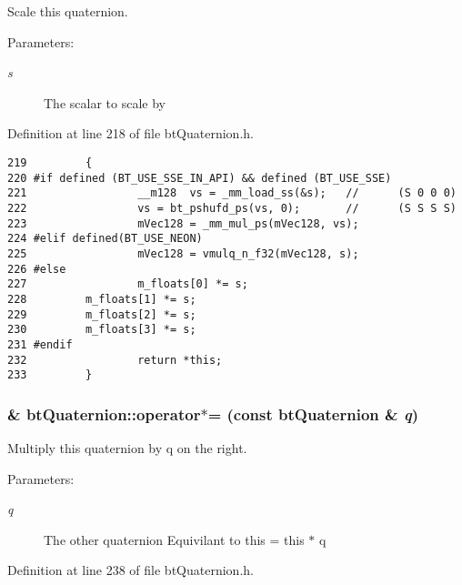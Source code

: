 Scale this quaternion. 

\begin{Desc}
\item[Parameters:]
\begin{description}
\item[{\em s}]The scalar to scale by \end{description}
\end{Desc}


Definition at line 218 of file btQuaternion.h.

\begin{Code}\begin{verbatim}219         {
220 #if defined (BT_USE_SSE_IN_API) && defined (BT_USE_SSE)
221                 __m128  vs = _mm_load_ss(&s);   //      (S 0 0 0)
222                 vs = bt_pshufd_ps(vs, 0);       //      (S S S S)
223                 mVec128 = _mm_mul_ps(mVec128, vs);
224 #elif defined(BT_USE_NEON)
225                 mVec128 = vmulq_n_f32(mVec128, s);
226 #else
227                 m_floats[0] *= s; 
228         m_floats[1] *= s; 
229         m_floats[2] *= s; 
230         m_floats[3] *= s;
231 #endif
232                 return *this;
233         }
\end{verbatim}
\end{Code}


\hypertarget{classbt_quaternion_bfc6dee30a6f56e69343a31368713f95}{
\subsubsection[operator$\ast$=]{\& btQuaternion::operator$\ast$= (const {\bf btQuaternion} \& {\em q})}}
\label{classbt_quaternion_bfc6dee30a6f56e69343a31368713f95}


Multiply this quaternion by q on the right. 

\begin{Desc}
\item[Parameters:]
\begin{description}
\item[{\em q}]The other quaternion Equivilant to this = this $\ast$ q \end{description}
\end{Desc}


Definition at line 238 of file btQuaternion.h.

